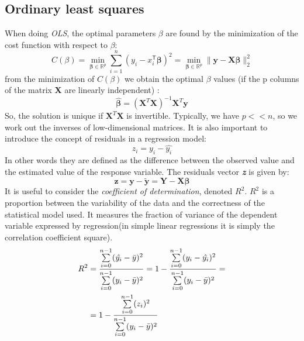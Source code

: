\documentclass{emulateapj}
\begin{document}
\subsection{Ordinary least squares}
When doing \textit{OLS}, the optimal parameters $\beta$ are found by the minimization of the cost function with respect to $\beta$:
\begin{equation}
C(\beta) =\min_{\boldsymbol{\beta} \in \mathbb{R}^p} \sum_{i=1}^{n}(y_i - x_i^\mathsf{T}\boldsymbol{\beta} )^2 = \min_{\boldsymbol{\beta} \in \mathbb{R}^p} \| \mathbf{y} - \mathbf{X}\boldsymbol{\beta} \|^2_2
\end{equation}
from the minimization of $C(\beta)$ we obtain the optimal $\beta$ values (if the p columns of the matrix \textbf{X} are linearly independent) :
\begin{equation}
\boldsymbol{\hat{\beta}}=(\mathbf{X}^T \mathbf{X})^{-1} \mathbf{X}^T\mathbf{y}
\end{equation}
So, the solution is unique if $\mathbf{X}^T \mathbf{X}$ is invertible. Typically, we have $p<<n$, so we work out the inverses of low-dimensional matrices. It is also important to introduce the concept of residuals in a regression model:
\begin{equation}
z_i=y_i-\hat{y_i}
\end{equation}
In other words they are defined as the difference between the observed value and the estimated value of the response variable.
The residuals vector \textbf{\textit{z}} is given by:
\begin{equation}
\mathbf{z}=\mathbf{y}-\mathbf{\tilde{y}}=\mathbf{Y-X\boldsymbol{\beta}}
\end{equation}
It is useful to consider  the \textit{coefficient of determination}, denoted $R^2$. $R^2$ is a proportion between the variability of the data and the correctness of the statistical model used. It measures the fraction of variance of the dependent variable expressed by regression(in simple linear regressions it is simply the correlation coefficient square). 
\begin{equation}
\begin{split}
R^2&= \frac{\sum\limits_{i=0}^{n-1}(\hat{y_i}-\Bar{y})^2}{\sum\limits_{i=0}^{n-1}(y_i-\Bar{y})^2}=
1-\frac{\sum\limits_{i=0}^{n-1}(y_i-\hat{y_i})^2}{\sum\limits_{i=0}^{n-1}(y_i-\Bar{y})^2}=\\&=1-\frac{\sum\limits_{i=0}^{n-1}(z_i)^2}{\sum\limits_{i=0}^{n-1}(y_i-\Bar{y})^2}
\end{split}
\end{equation}
\end{document}
